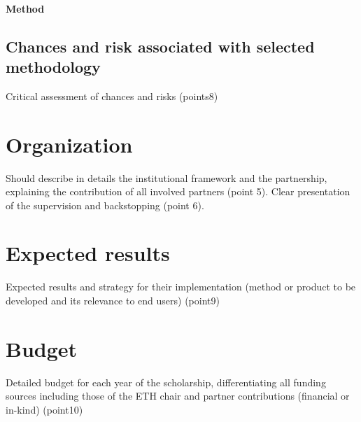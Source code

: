 \documentclass[11pt]{article}
\begin{document}
\paragraph{Method}



\subsection{Chances and risk associated with selected methodology}\label{risk}
Critical assessment of chances and risks (points8)

\section{Organization}\label{organization}
Should describe in details the institutional framework and the partnership, explaining the contribution of all involved partners (point 5). Clear presentation of the supervision and backstopping (point 6).

\section{Expected results}\label{expected}
Expected results and strategy for their implementation (method or product to be developed and its relevance to end users) (point9)

\section{Budget}
Detailed budget for each year of the scholarship, differentiating all funding sources including those of the ETH chair and partner contributions (financial or in-kind) (point10)




\end{document}
